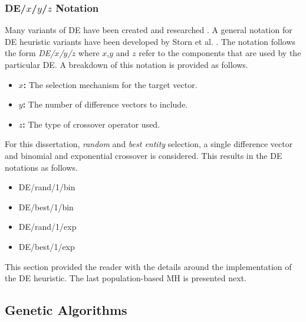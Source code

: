 \subsubsection{DE/$x$/$y$/$z$ Notation}

Many variants of \ac{DE} have been created and researched \cite{ref:mezura:2006}. A general notation for \ac{DE} heuristic variants have been developed by Storn et al. \cite{ref:storn:1996}\cite{ref:storn:1997}. The notation follows the form \textit{DE/$x$/$y$/$z$} where $x$,$y$ and $z$ refer to the components that are used by the particular \ac{DE}. A breakdown of this notation is provided as follows.

\begin{itemize}
      \item \textbf{$x$:} The selection mechanism for the target vector.
      \item \textbf{$y$:} The number of difference vectors to include.
      \item \textbf{$z$:} The type of crossover operator used.
\end{itemize}

For this dissertation, \textit{random} and \textit{best entity} selection, a single difference vector and binomial and exponential crossover is considered. This results in the \ac{DE} notations as follows.

\begin{itemize}
      \item DE/rand/1/bin
      \item DE/best/1/bin
      \item DE/rand/1/exp
      \item DE/best/1/exp
\end{itemize}

This section provided the reader with the details around the implementation of the \ac{DE} heuristic. The last population-based \ac{MH} is presented next.


\subsection{Genetic Algorithms}
\label{sec:heuristics:mh:ga}

